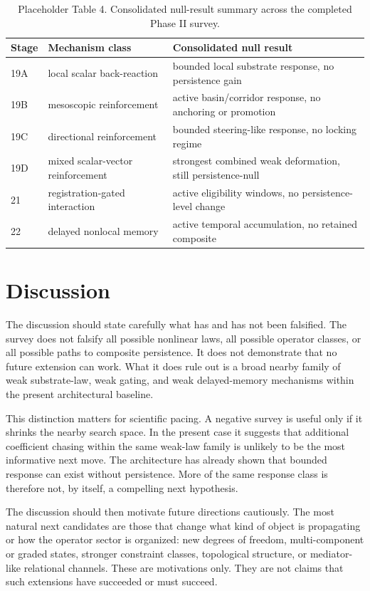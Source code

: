 \documentclass[11pt]{article}
\begin{document}
\begin{table}[h]
\centering
\small
\begin{tabular}{@{}p{1.0in}p{2.0in}p{2.6in}@{}}
\toprule
Stage & Mechanism class & Consolidated null result \\
\midrule
19A & local scalar back-reaction & bounded local substrate response, no persistence gain \\
19B & mesoscopic reinforcement & active basin/corridor response, no anchoring or promotion \\
19C & directional reinforcement & bounded steering-like response, no locking regime \\
19D & mixed scalar-vector reinforcement & strongest combined weak deformation, still persistence-null \\
21 & registration-gated interaction & active eligibility windows, no persistence-level change \\
22 & delayed nonlocal memory & active temporal accumulation, no retained composite \\
\bottomrule
\end{tabular}
\caption{Placeholder Table 4. Consolidated null-result summary across the completed Phase II survey.}
\label{tab:null_summary}
\end{table}

\section{Discussion}

The discussion should state carefully what has and has not been falsified. The survey does not falsify all possible nonlinear laws, all possible operator classes, or all possible paths to composite persistence. It does not demonstrate that no future extension can work. What it does rule out is a broad nearby family of weak substrate-law, weak gating, and weak delayed-memory mechanisms within the present architectural baseline.

This distinction matters for scientific pacing. A negative survey is useful only if it shrinks the nearby search space. In the present case it suggests that additional coefficient chasing within the same weak-law family is unlikely to be the most informative next move. The architecture has already shown that bounded response can exist without persistence. More of the same response class is therefore not, by itself, a compelling next hypothesis.

The discussion should then motivate future directions cautiously. The most natural next candidates are those that change what kind of object is propagating or how the operator sector is organized: new degrees of freedom, multi-component or graded states, stronger constraint classes, topological structure, or mediator-like relational channels. These are motivations only. They are not claims that such extensions have succeeded or must succeed.
\end{document}
